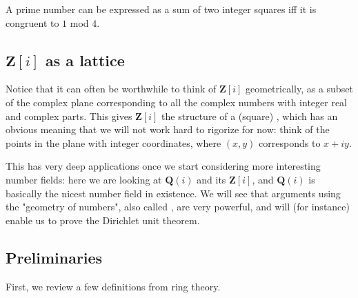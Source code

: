 \begin{theorem*}[Fermat]
  A prime number can be expressed as a sum of two integer squares iff it is
  congruent to \(1\) mod \(4\).
\end{theorem*}

\subsection{\({\mathbf Z}[i]\) as a lattice}

Notice that it can often be worthwhile to think of \({\mathbf Z}[i]\)
geometrically, as a subset of the complex plane corresponding to all the complex
numbers with integer real and complex parts. This gives \({\mathbf Z}[i]\) the
structure of a (square) , which has an obvious meaning that we
will not work hard to rigorize for now: think of the points in the plane with
integer coordinates, where \( (x,y) \) corresponds to \( x+iy \).

\begin{figure}
  \centering
\end{figure}

\begin{aside}
  This has very deep applications once we start considering more interesting
  number fields: here we are looking at \({\mathbf Q}(i)\) and its  \({\mathbf Z}[i]\), and \({\mathbf Q}(i)\) is basically the
  nicest number field in existence. We will see that arguments using the
  "geometry of numbers", also called , are very powerful, and
  will (for instance) enable us to prove the Dirichlet unit theorem.
\end{aside}
\subsection{Preliminaries}

First, we review a few definitions from ring theory.

